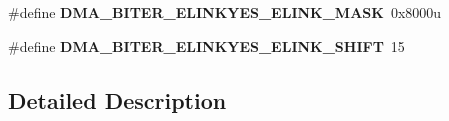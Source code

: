 \begin{DoxyCompactItemize}
\item 
\hypertarget{group___d_m_a___register___masks_ga778135a3df3e1f1696c74d53062dbe27}{}\#define {\bfseries D\+M\+A\+\_\+\+B\+I\+T\+E\+R\+\_\+\+E\+L\+I\+N\+K\+Y\+E\+S\+\_\+\+E\+L\+I\+N\+K\+\_\+\+M\+A\+S\+K}~0x8000u\label{group___d_m_a___register___masks_ga778135a3df3e1f1696c74d53062dbe27}

\item 
\hypertarget{group___d_m_a___register___masks_ga140716200d5f09b3f8819f8794444008}{}\#define {\bfseries D\+M\+A\+\_\+\+B\+I\+T\+E\+R\+\_\+\+E\+L\+I\+N\+K\+Y\+E\+S\+\_\+\+E\+L\+I\+N\+K\+\_\+\+S\+H\+I\+F\+T}~15\label{group___d_m_a___register___masks_ga140716200d5f09b3f8819f8794444008}

\end{DoxyCompactItemize}


\subsection{Detailed Description}
